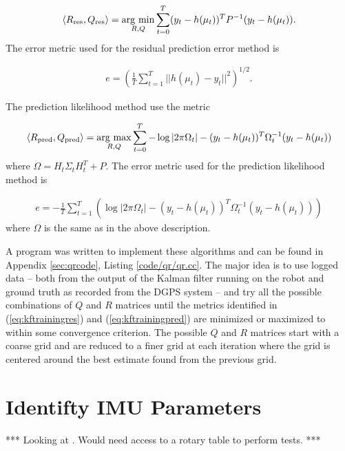 \begin{align*}
\left<R_{\text{res}},Q_{\text{res}}\right> = \mathop{\arg\,\min}\limits_{R,Q}\sum_{t=0}^T (y_t-h(\mu_t))^TP^{-1}(y_t-h(\mu_t)).
\end{align*}
The error metric used for the residual prediction error method is

\begin{align}
\label{eq:kftrainingres}
e = \left(\frac{1}{T}\sum_{t=1}^T ||h(\mu_t)-y_t||^2\right)^{1/2}.
\end{align}

The prediction likelihood method use the metric

\begin{align*}
\left<R_{\text{pred}},Q_{\text{pred}}\right> = \mathop{\arg\,\max}\limits_{R,Q}\sum_{t=0}^T -\log|2\pi\Omega_t| - (y_t-h(\mu_t))^T\Omega_t^{-1}(y_t-h(\mu_t))
\end{align*}
where $\Omega = H_t\Sigma_tH_t^T+P$. The error metric used for the prediction likelihood method is

\begin{align}
\label{eq:kftrainingpred}
e = -\frac{1}{T}\sum_{t=1}^T \left(\log|2\pi\Omega_t| - (y_t-h(\mu_t))^T\Omega_t^{-1}(y_t-h(\mu_t))\right)
\end{align}
where $\Omega$ is the same as in the above description.

A program was written to implement these algorithms and can be found in Appendix \ref{sec:qrcode}, Listing \ref{code/qr/qr.cc}. The major idea is to use logged data -- both from the output of the Kalman filter running on the robot and ground truth as recorded from the DGPS system -- and try all the possible combinations of $Q$ and $R$ matrices until the metrics identified in (\ref{eq:kftrainingres}) and (\ref{eq:kftrainingpred}) are minimized or maximized to within some convergence criterion. The possible $Q$ and $R$ matrices start with a coarse grid and are reduced to a finer grid at each iteration where the grid is centered around the best estimate found from the previous grid.

\section{Identifty IMU Parameters}
\label{sec:identifyimuparams}
*** Looking at \cite{ChungOjeda01}. Would need access to a rotary table to perform tests. ***